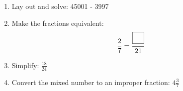 \documentclass{article}
\begin{document}
\begin{enumerate}
\item \quad Lay out and solve: \hspace{2cm} 45001 - 3997 %
\vspace{10pt}

 \vspace{5pt}

 \item \quad Make the fractions equivalent: $$ \displaystyle\frac{2}{7} = 
\genfrac{}{}{1pt}{0}{\fbox{\makebox[1em]{\rule{0pt}{1em}}}}{21} $$
\vspace{10pt}

\item \quad Simplify: \(  \displaystyle \frac{18}{24} \)
\vspace{10pt}

\item \quad Convert the mixed number to an improper fraction: \(  \displaystyle 4 \frac{3}{7} \) \\


\end{enumerate}

 
\end{document}
